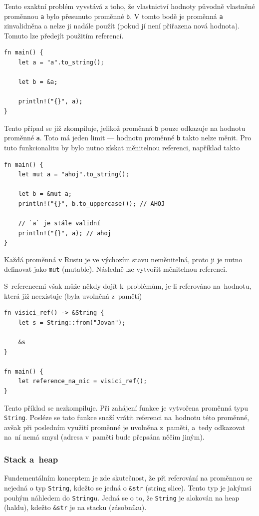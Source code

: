 \documentclass[a4paper, 12pt, twoside]{article} %
\newcommand{\rust}[1]{\texttt{#1}}
\begin{document}
				Tento exaktní problém vyvstává z toho, že vlastnictví hodnoty původně vlastněné proměnnou \texttt{a} bylo přesunuto proměnné \texttt{b}. V tomto bodě je proměnná \texttt{a} zinvalidněna a nelze ji nadále použít (pokud jí není přiřazena nová hodnota). Tomuto lze předejít použitím referencí.
				\begin{verbatim}
fn main() {
	let a = "a".to_string();
	
	let b = &a;
	
	println!("{}", a);
}
				\end{verbatim}
		
				Tento případ se již zkompiluje, jelikož proměnná \texttt{b} pouze odkazuje na hodnotu proměnné \texttt{a}. Toto má jeden limit — hodnotu proměnné \texttt{b} takto nelze měnit. Pro tuto funkcionalitu by bylo nutno získat měnitelnou referenci, například takto
				\begin{verbatim}
fn main() {
	let mut a = "ahoj".to_string();
	
	let b = &mut a;
	println!("{}", b.to_uppercase()); // AHOJ

	// `a` je stále validní
	println!("{}", a); // ahoj
}
				\end{verbatim}
	
				Každá proměnná v Rustu je ve výchozím stavu neměnitelná, proto ji je nutno definovat jako \texttt{mut} (mutable). Následně lze vytvořit měnitelnou referenci.
				
				S~referencemi však může někdy dojít k~problémům, je-li referováno na~hodnotu, která již neexistuje (byla uvolněná z~paměti)
				\begin{verbatim}
fn visici_ref() -> &String {
	let s = String::from("Jovan");

	&s
}

fn main() {
	let reference_na_nic = visici_ref();
}
				\end{verbatim}
				\cite{dangle}
					
				Tento příklad se nezkompiluje. Při zahájení funkce je vytvořena proměnná typu \rust{String}. Posléze se tato funkce snaží vrátit referenci na~hodnotu této proměnné, avšak při posledním využití proměnné je uvolněna z~paměti, a~tedy odkazovat na~ní nemá smysl (adresa v~paměti bude přepsána něčím jiným).
			
			\subsubsection*{Stack a~heap}
				Fundementálním konceptem je zde skutečnost, že při referování na proměnnou se nejedná o typ \texttt{String}, kdežto se jedná o \texttt{\&str} (string slice). Tento typ je jakýmsi pouhým náhledem do \texttt{String}u. Jedná se o to, že \texttt{String} je alokován na heap (haldu), kdežto \texttt{\&str} je na stacku (zásobníku).
				
\end{document}
